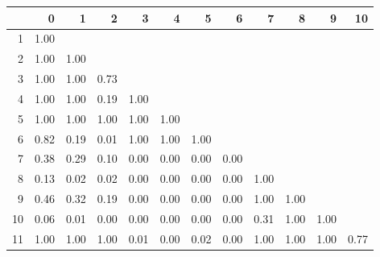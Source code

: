 % 
\begin{tabular}{rrrrrrrrrrrr}
  \hline
 & 0 & 1 & 2 & 3 & 4 & 5 & 6 & 7 & 8 & 9 & 10 \\ 
  \hline
1 & 1.00 &  &  &  &  &  &  &  &  &  &  \\ 
  2 & 1.00 & 1.00 &  &  &  &  &  &  &  &  &  \\ 
  3 & 1.00 & 1.00 & 0.73 &  &  &  &  &  &  &  &  \\ 
  4 & 1.00 & 1.00 & 0.19 & 1.00 &  &  &  &  &  &  &  \\ 
  5 & 1.00 & 1.00 & 1.00 & 1.00 & 1.00 &  &  &  &  &  &  \\ 
  6 & 0.82 & 0.19 & 0.01 & 1.00 & 1.00 & 1.00 &  &  &  &  &  \\ 
  7 & 0.38 & 0.29 & 0.10 & 0.00 & 0.00 & 0.00 & 0.00 &  &  &  &  \\ 
  8 & 0.13 & 0.02 & 0.02 & 0.00 & 0.00 & 0.00 & 0.00 & 1.00 &  &  &  \\ 
  9 & 0.46 & 0.32 & 0.19 & 0.00 & 0.00 & 0.00 & 0.00 & 1.00 & 1.00 &  &  \\ 
  10 & 0.06 & 0.01 & 0.00 & 0.00 & 0.00 & 0.00 & 0.00 & 0.31 & 1.00 & 1.00 &  \\ 
  11 & 1.00 & 1.00 & 1.00 & 0.01 & 0.00 & 0.02 & 0.00 & 1.00 & 1.00 & 1.00 & 0.77 \\ 
   \hline
\end{tabular}
% 
